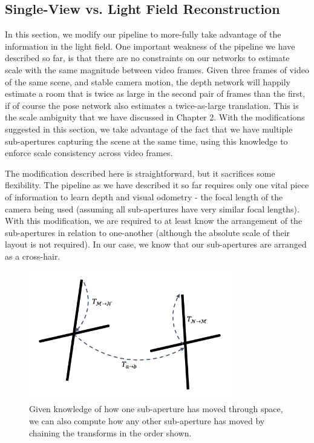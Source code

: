 \subsection{Single-View vs. Light Field Reconstruction}


In this section, we modify our pipeline to more-fully take advantage of the information in the light field. One important weakness of the pipeline we have described so far, is that there are no constraints on our networks to estimate scale with the same magnitude between video frames. Given three frames of video of the same scene, and stable camera motion, the depth network will happily estimate a room that is twice as large in the second pair of frames than the first, if of course the pose network also estimates a twice-as-large translation. This is the scale ambiguity that we have discussed in Chapter 2. With the modifications suggested in this section, we take advantage of the fact that we have multiple sub-apertures capturing the scene at the same time, using this knowledge to enforce scale consistency across video frames. 

The modification described here is straightforward, but it sacrifices some flexibility. The pipeline as we have described it so far requires only one vital piece of information to learn depth and visual odometry - the focal length of the camera being used (assuming all sub-apertures have very similar focal lengths). With this modification, we are required to at least know the arrangement of the sub-apertures in relation to one-another (although the absolute scale of their layout is not required). In our case, we know that our sub-apertures are arranged as a cross-hair. 

\begin{figure}[htbp]
    \centering 
    \includegraphics[width=3.5in]{images/relative_subapertures.png}
    \caption[The relationship between sub-apertures as the light field camera moves through space]{Given knowledge of how one sub-aperture has moved through space, we can also compute how any other sub-aperture has moved by chaining the transforms in the order shown.}
\end{figure}

